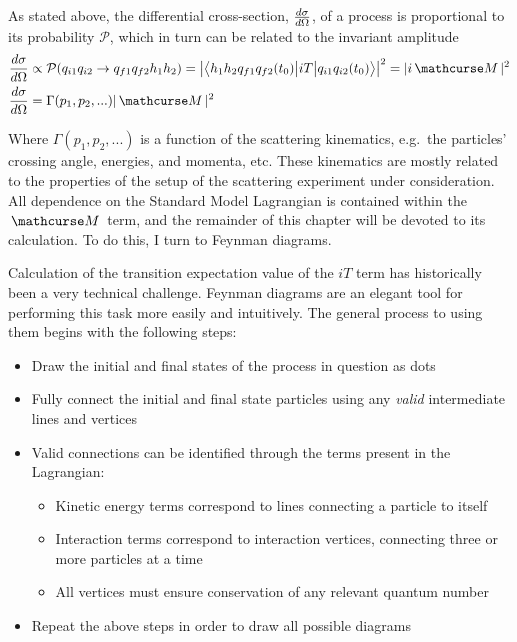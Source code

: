     As stated above, the differential cross-section, $\frac{d\sigma}{d\Omega}$,
        of a process is proportional to its probability $\mathcal{P}$,
        which in turn can be related to the invariant amplitude
    \begin{equation} \begin{split}
        \dXsec &\propto \mathcal{P}( q_{i1} q_{i2} \rightarrow q_{f1} q_{f2} h_1 h_2 ) 
            = \left| \TbraketA{ h_1 h_2 q_{f1} q_{f2} (t_0)}{iT}{q_{i1} q_{i2} (t_0)} \right|^2 
            = |i \invAmp|^2 
        \\\dXsec &= \Gamma(p_1, p_2, ...) |\invAmp|^2
    \end{split} \end{equation}

    Where $\Gamma(p_1, p_2, ...)$ is a function of the scattering kinematics,
        e.g.\ the particles' crossing angle, energies, and momenta, etc.
    These kinematics are mostly related to the properties of the setup of the scattering experiment under consideration.
    All dependence on the Standard Model Lagrangian is contained within the $\invAmp$ term,
        and the remainder of this chapter will be devoted to its calculation.
    To do this, I turn to Feynman diagrams.

    Calculation of the transition expectation value of the $iT$ term has historically been a very technical challenge.
    Feynman diagrams are an elegant tool for performing this task more easily and intuitively.
    The general process to using them begins with the following steps:
    \begin{itemize}
        \item Draw the initial and final states of the process in question as dots
        \item Fully connect the initial and final state particles using any \textit{valid} intermediate lines and vertices
        \item Valid connections can be identified through the terms present in the Lagrangian:
        \begin{itemize}
            \item Kinetic energy terms correspond to lines connecting a particle to itself
            \item Interaction terms correspond to interaction vertices, connecting three or more particles at a time
            \item All vertices must ensure conservation of any relevant quantum number
        \end{itemize}
        \item Repeat the above steps in order to draw all possible diagrams
    \end{itemize}

